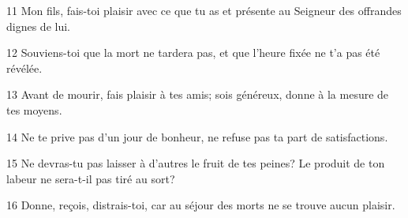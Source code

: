 
11 Mon fils, fais-toi plaisir avec ce que tu as et présente au Seigneur des offrandes dignes de lui.

12 Souviens-toi que la mort ne tardera pas, et que l’heure fixée ne t’a pas été révélée.

13 Avant de mourir, fais plaisir à tes amis; sois généreux, donne à la mesure de tes moyens.

14 Ne te prive pas d’un jour de bonheur, ne refuse pas ta part de satisfactions.

15 Ne devras-tu pas laisser à d’autres le fruit de tes peines? Le produit de ton labeur ne sera-t-il pas tiré au sort?

16 Donne, reçois, distrais-toi, car au séjour des morts ne se trouve aucun plaisir.